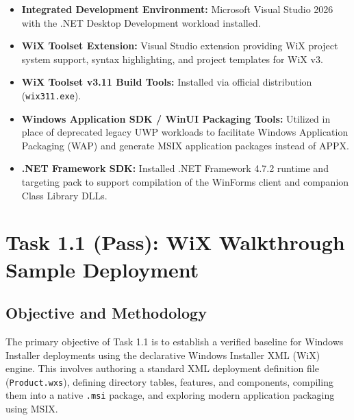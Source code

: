 \documentclass[11pt,a4paper]{article}
\begin{document}
\begin{itemize}[leftmargin=1.5cm]
    \item \textbf{Integrated Development Environment:} Microsoft Visual Studio 2026 with the .NET Desktop Development workload installed.
    \item \textbf{WiX Toolset Extension:} Visual Studio extension providing WiX project system support, syntax highlighting, and project templates for WiX v3.
    \item \textbf{WiX Toolset v3.11 Build Tools:} Installed via official distribution (\texttt{wix311.exe}).
    \item \textbf{Windows Application SDK / WinUI Packaging Tools:} Utilized in place of deprecated legacy UWP workloads to facilitate Windows Application Packaging (WAP) and generate MSIX application packages instead of APPX.
    \item \textbf{.NET Framework SDK:} Installed .NET Framework 4.7.2 runtime and targeting pack to support compilation of the WinForms client and companion Class Library DLLs.
\end{itemize}

\section{Task 1.1 (Pass): WiX Walkthrough Sample Deployment}

\subsection{Objective and Methodology}
The primary objective of Task 1.1 is to establish a verified baseline for Windows Installer deployments using the declarative Windows Installer XML (WiX) engine. This involves authoring a standard XML deployment definition file (\texttt{Product.wxs}), defining directory tables, features, and components, compiling them into a native \texttt{.msi} package, and exploring modern application packaging using MSIX.
\end{document}
